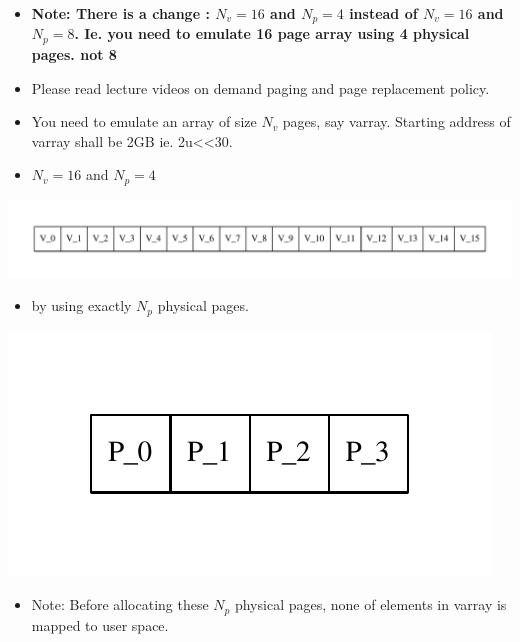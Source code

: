 \documentclass[]{book}
\begin{document}
\begin{itemize}
\item
  \textbf{Note: There is a change : \(N_v=16\) and \(N_p=4\) instead of
  \(N_v=16\) and \(N_p=8\). Ie. you need to emulate 16 page array using
  4 physical pages. not 8}
\item
  Please read lecture videos on demand paging and page replacement
  policy.
\item
  You need to emulate an array of size \(N_v\) pages, say varray.
  Starting address of varray shall be 2GB ie.
  2u\textless{}\textless{}30.
\item
  \(N_v=16\) and \(N_p=4\)
\end{itemize}

\includegraphics{graphviz-images/2623b6fa1d58130a3904de5d38846fcc56312f9d.pdf}

\begin{itemize}
\itemsep1pt\parskip0pt
\item
  by using exactly \(N_p\) physical pages.
\end{itemize}

\includegraphics{graphviz-images/a0f1bdeb6728d1f45ef7706fb8ab2cf34b03ad49.pdf}

\begin{itemize}
\itemsep1pt\parskip0pt
\item
  Note: Before allocating these \(N_p\) physical pages, none of elements
  in varray is mapped to user space.
\end{itemize}
\end{document}
